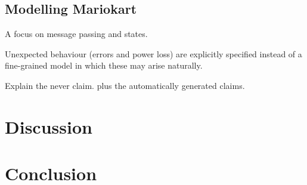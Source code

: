 \subsection{Modelling Mariokart}
A focus on message passing and states.

Unexpected behaviour (errors and power loss) are explicitly specified instead of 
a fine-grained model in which these may arise naturally.

Explain the never claim. plus the automatically generated claims.


\section{Discussion}

\section{Conclusion}
